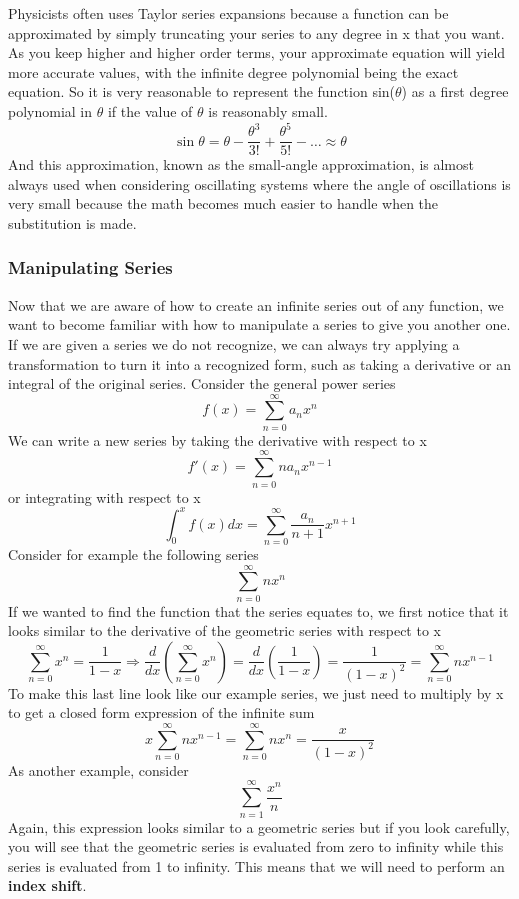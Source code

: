 \documentclass{article}
\newcommand{\be}{\begin{equation}}
\newcommand{\ee}{\end{equation}}
\newcommand{\sumzero}{\sum_{n=0}^\infty}
\newcommand{\sumone}{\sum_{n=1}^\infty}
\begin{document}
Physicists often uses Taylor series expansions because a function can be approximated by simply truncating your series to any degree in x that you want.
As you keep higher and higher order terms, your approximate equation will yield more accurate values, with the infinite degree polynomial being the exact equation.
So it is very reasonable to represent the function sin($\theta$) as a first degree polynomial in $\theta$ if the value of $\theta$ is reasonably small.
\be
\sin{\theta} = \theta - \frac{\theta^3}{3!} + \frac{\theta^5}{5!} - \hdots \approx \theta
\ee
And this approximation, known as the small-angle approximation, is almost always used when considering oscillating systems where the angle of oscillations is very small because the math becomes much easier to handle when the substitution is made.

\subsubsection*{Manipulating Series}
Now that we are aware of how to create an infinite series out of any function, we want to become familiar with how to manipulate a series to give you another one.
If we are given a series we do not recognize, we can always try applying a transformation to turn it into a recognized form, such as taking a derivative or an integral of the original series.
Consider the general power series
\be
f(x) = \sumzero a_nx^n
\ee
We can write a new series by taking the derivative with respect to x
\be
f'(x) = \sumzero na_nx^{n-1}
\ee
or integrating with respect to x
\be
\int_{0}^{x} f(x) dx = \sumzero \frac{a_n}{n+1}x^{n+1}
\ee
Consider for example the following series
\be
\sumzero nx^n
\ee
If we wanted to find the function that the series equates to, we first notice that it looks similar to the derivative of the geometric series with respect to x
\be
	\sumzero x^n = \frac{1}{1-x} \Rightarrow \frac{d}{dx} \left( \sumzero x^n\right) = \frac{d}{dx} \left( \frac{1}{1-x} \right) = \frac{1}{(1-x)^2} = \sumzero nx^{n-1}
\ee
To make this last line look like our example series, we just need to multiply by x to get a closed form expression of the infinite sum
\be
x \sumzero nx^{n-1} = \sumzero nx^{n} = \frac{x}{(1-x)^2}
\ee
As another example, consider
\be
\sumone \frac{x^n}{n}
\ee
Again, this expression looks similar to a geometric series but if you look carefully, you will see that the geometric series is evaluated from zero to infinity while this series is evaluated from 1 to infinity.
This means that we will need to perform an \textbf{index shift}.
\end{document}
